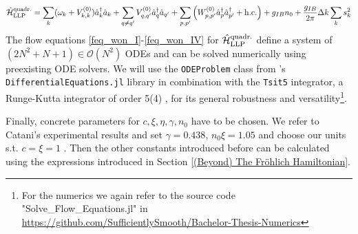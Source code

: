 \begin{equation}\label{Ham_LLP_qudratic}
\hat{\mathcal{H}}_{\mathrm{LLP}}^{\mathrm{quadr.}}=\sum\limits_k (\omega_k +V_{k,k}^{(0)})\hat a^\dagger_k\hat a_k+\sum\limits_{q\neq q^\prime}V_{q,q^\prime}^{(0)}\hat a^\dagger_q\hat a_{q^\prime}+\sum\limits_{p,p^\prime}\left(W_{p,p^\prime}^{(0)}\hat a^\dagger_p\hat a^\dagger_{p^\prime}+\mathrm{h.c.}\right)+g_{IB}n_0+\frac{g_{IB}}{2\pi}\Delta k\sum\limits_{k}s_k^2
\end{equation}
The flow equations \ref{feq_won_I}-\ref{feq_won_IV} for $\hat{\mathcal{H}}_{\mathrm{LLP}}^{\mathrm{quadr.}}$ define a system of $(2N^2+N+1)\in\mathcal O(N^2)$ ODEs and can be solved numerically using preexisting ODE solvers. We will use the \verb!ODEProblem! class from \julialogo's \verb!DifferentialEquations.jl! library in combination with the \verb!Tsit5! integrator, a Runge-Kutta integrator of order 5(4) \cite{TSITOURAS2011770}, for its general robustness and versatility\footnote{For the numerics we again refer to the source code "Solve\_Flow\_Equations.jl" in \url{https://github.com/SufficientlySmooth/Bachelor-Thesis-Numerics}}.\par
Finally, concrete parameters for $c,\xi,\eta,\gamma,n_0$ have to be chosen. We refer to Catani's experimental results and set $\gamma=0.438$, $n_0\xi=1.05$ and choose our units s.t. $c=\xi=1$ \cite{Catani,Grusdt_2017}.
Then the other constants introduced before can be calculated using the expressions introduced in Section \ref{(Beyond) The Fröhlich Hamiltonian}.

